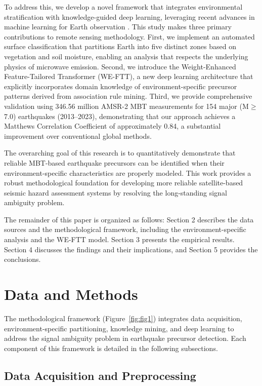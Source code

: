 \documentclass[preprint,review,12pt,authoryear]{elsarticle}
\begin{document}
To address this, we develop a novel framework that integrates environmental stratification with knowledge-guided deep learning, leveraging recent advances in machine learning for Earth observation \citep{reichsteinDeepLearningEarth2019,zhuDeepLearningRemote2017}. This study makes three primary contributions to remote sensing methodology. First, we implement an automated surface classification that partitions Earth into five distinct zones based on vegetation and soil moisture, enabling an analysis that respects the underlying physics of microwave emission. Second, we introduce the Weight-Enhanced Feature-Tailored Transformer (WE-FTT), a new deep learning architecture that explicitly incorporates domain knowledge of environment-specific precursor patterns derived from association rule mining. Third, we provide comprehensive validation using 346.56 million AMSR-2 MBT measurements for 154 major (M$\ge$7.0) earthquakes (2013--2023), demonstrating that our approach achieves a Matthews Correlation Coefficient of approximately 0.84, a substantial improvement over conventional global methods.

The overarching goal of this research is to quantitatively demonstrate that reliable MBT-based earthquake precursors can be identified when their environment-specific characteristics are properly modeled. This work provides a robust methodological foundation for developing more reliable satellite-based seismic hazard assessment systems by resolving the long-standing signal ambiguity problem.

The remainder of this paper is organized as follows: Section 2 describes the data sources and the methodological framework, including the environment-specific analysis and the WE-FTT model. Section 3 presents the empirical results. Section 4 discusses the findings and their implications, and Section 5 provides the conclusions.

\section{Data and Methods}\label{sec:data_methods}

The methodological framework (Figure~\ref{fig:fig1}) integrates data acquisition, environment-specific partitioning, knowledge mining, and deep learning to address the signal ambiguity problem in earthquake precursor detection. Each component of this framework is detailed in the following subsections.

\subsection{Data Acquisition and Preprocessing}\label{sec:data_acquisition}
\end{document}
